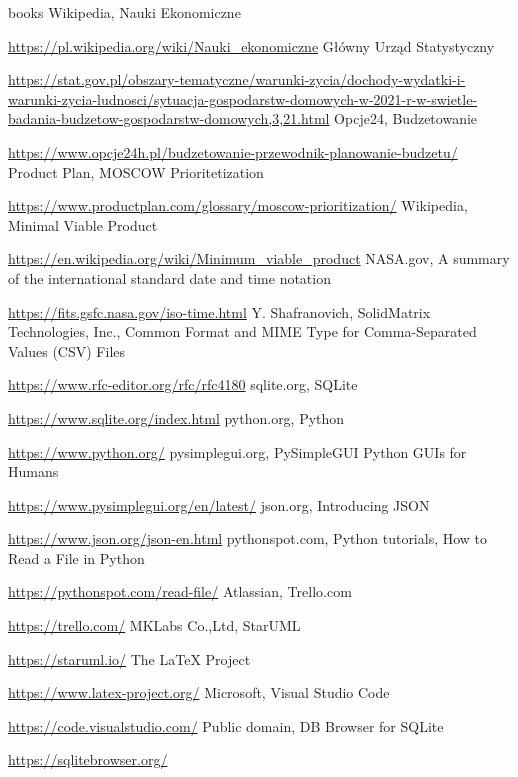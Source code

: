 \documentclass[a4paper,10pt]{report}
\begin{document}
\begin{thebibliography} {books}
 Wikipedia, Nauki Ekonomiczne \raggedright\url{
    https://pl.wikipedia.org/wiki/Nauki_ekonomiczne}
 Główny Urząd Statystyczny \raggedright\url{
    https://stat.gov.pl/obszary-tematyczne/warunki-zycia/dochody-wydatki-i-warunki-zycia-ludnosci/sytuacja-gospodarstw-domowych-w-2021-r-w-swietle-badania-budzetow-gospodarstw-domowych,3,21.html}
 Opcje24, Budzetowanie \raggedright\url{
    https://www.opcje24h.pl/budzetowanie-przewodnik-planowanie-budzetu/}
 Product Plan, MOSCOW Prioritetization \raggedright\url{
    https://www.productplan.com/glossary/moscow-prioritization/}
 Wikipedia, Minimal Viable Product \raggedright\url{
    https://en.wikipedia.org/wiki/Minimum_viable_product}
 NASA.gov, A summary of the international standard date and time notation \raggedright\url{
    https://fits.gsfc.nasa.gov/iso-time.html}
 Y. Shafranovich, SolidMatrix Technologies, Inc., Common Format and MIME Type for Comma-Separated Values (CSV) Files \raggedright\url{
    https://www.rfc-editor.org/rfc/rfc4180}
 sqlite.org, SQLite \raggedright\url{
    https://www.sqlite.org/index.html}
 python.org, Python \raggedright\url{
    https://www.python.org/}
 pysimplegui.org, PySimpleGUI Python GUIs for Humans \raggedright\url{
    https://www.pysimplegui.org/en/latest/}
 json.org, Introducing JSON \raggedright\url{
    https://www.json.org/json-en.html}
 pythonspot.com, Python tutorials, How to Read a File in Python \raggedright\url{
    https://pythonspot.com/read-file/}
 Atlassian, Trello.com \raggedright\url{
    https://trello.com/}
 MKLabs Co.,Ltd, StarUML \raggedright\url{
    https://staruml.io/}
 The LaTeX Project \raggedright\url{
    https://www.latex-project.org/}
 Microsoft, Visual Studio Code \raggedright\url{
    https://code.visualstudio.com/}   
 Public domain, DB Browser for SQLite \raggedright\url{
    https://sqlitebrowser.org/}   
\end{thebibliography}

\listoffigures
\listoftables
\lstlistoflistings
\end{document}
